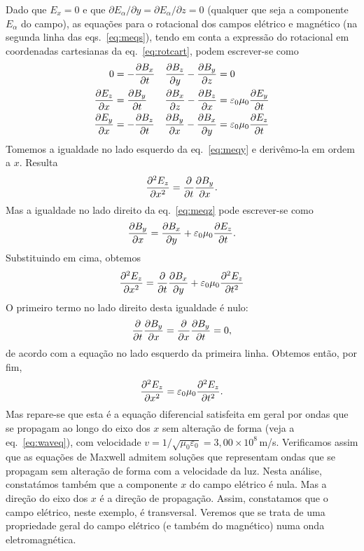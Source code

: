 Dado que $E_x=0$ e que $\partial E_\alpha/\partial y=\partial E_\alpha/\partial
z=0$ (qualquer que seja a componente $E_\alpha$ do campo), as equações para o
rotacional dos campos elétrico e magnético (na segunda linha das
eqs.~\eqref{eq:meqs}), tendo em conta a expressão do rotacional em coordenadas
cartesianas da eq.~\eqref{eq:rotcart}, podem escrever-se como
\begin{subequations}
\begin{align}
  0&=-\frac{\partial B_x}{\partial t}&        \frac{\partial B_z}{\partial y}-\frac{\partial B_y}{\partial z}&=0\label{eq:meqx}\\
  \frac{\partial E_z}{\partial x}&=\frac{\partial B_y}{\partial t}&  \frac{\partial B_x}{\partial z}-\frac{\partial B_z}{\partial x}&=
    \varepsilon_0\mu_0\frac{\partial E_y}{\partial t} \label{eq:meqy}\\
  \frac{\partial E_y}{\partial x}&=-\frac{\partial B_z}{\partial t}& 
    \frac{\partial B_y}{\partial x}-\frac{\partial B_x}{\partial y}&=\varepsilon_0\mu_0\frac{\partial E_z}{\partial t}\label{eq:meqz}
\end{align}
\end{subequations}
Tomemos a igualdade no lado esquerdo da eq.~\eqref{eq:meqy} e derivêmo-la em
ordem a $x$. Resulta
\begin{equation*}
  \frac{\partial^2 E_z}{\partial x^2}=\frac{\partial }{\partial t}\frac{\partial B_y}{\partial x}.
\end{equation*}
Mas a igualdade no lado direito da eq.~\eqref{eq:meqz} pode escrever-se como
\begin{equation*}
  \frac{\partial B_y}{\partial x}=\frac{\partial B_x}{\partial y}+\varepsilon_0\mu_0\frac{\partial E_z}{\partial t}.
\end{equation*}
Substituindo em cima, obtemos
\begin{equation*}
  \frac{\partial^2 E_z}{\partial x^2}=\frac{\partial }{\partial t}\frac{\partial B_x}{\partial y}+\varepsilon_0\mu_0\frac{\partial^2 E_z}{\partial t^2}
\end{equation*}
O primeiro termo no lado direito desta igualdade é nulo:
\begin{equation*}
  \frac{\partial }{\partial t}\frac{\partial B_y}{\partial x}=\frac{\partial }{\partial x}\frac{\partial B_y}{\partial t}=0,
\end{equation*}
de acordo com a equação no lado esquerdo da primeira linha. Obtemos então, por
fim,
\begin{equation*}
  \frac{\partial^2 E_z}{\partial x^2}=\varepsilon_0\mu_0\frac{\partial^2 E_z}{\partial t^2}.
\end{equation*}
Mas repare-se que esta é a equação diferencial satisfeita em geral por ondas que
se propagam ao longo do eixo dos $x$ sem alteração de forma (veja a
eq.~\eqref{eq:waveq}), com velocidade
$v=1/\sqrt{\mu_0\varepsilon_0}=3,00\times10^{8}$\,m/s.  Verificamos assim que as
equações de Maxwell admitem soluções que representam ondas que se propagam sem
alteração de forma com a velocidade da luz. Nesta análise, constatámos também que a
componente $x$ do campo elétrico é nula. Mas a direção do eixo dos $x$ é a
direção de propagação.  Assim, constatamos que o campo elétrico, neste exemplo,
é transversal. Veremos que se trata de uma propriedade geral do campo elétrico
(e também do magnético) numa onda eletromagnética.

